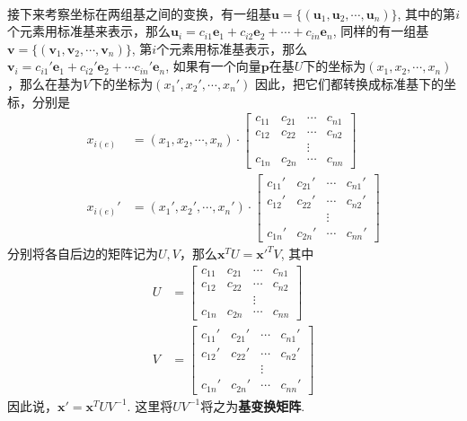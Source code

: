 \paragraph{}
接下来考察坐标在两组基之间的变换，有一组基$\textbf{u} = \{ (\textbf{u}_1, \textbf{u}_2, \cdots, \textbf{u}_n) \}$, 其中的第$i$个元素用标准基来表示，那么$\textbf{u}_i = c_{i1}\textbf{e}_1 + c_{i2}\textbf{e}_2 + \cdots + c_{in}\textbf{e}_n$, 同样的有一组基$\textbf{v} = \{ (\textbf{v}_1, \textbf{v}_2, \cdots, \textbf{v}_n) \}$, 第$i$个元素用标准基表示，那么$\textbf{v}_i = c_{i1}' \textbf{e}_1 + c_{i2}' \textbf{e}_2 + \cdots c_{in}' \textbf{e}_n$, 如果有一个向量$\textbf{p}$在基$U$下的坐标为$(x_1, x_2, \cdots, x_n)$，那么在基为$V$下的坐标为$(x_1', x_2', \cdots, x_n')$
因此，把它们都转换成标准基下的坐标，分别是
\begin{align*}
x_{i(e)} & = (x_1, x_2, \cdots, x_n) \cdot  \begin{bmatrix}
    c_{11} & c_{21} & \cdots & c_{n1} \\
    c_{12} & c_{22} & \cdots & c_{n2} \\
    & & \vdots & \\
    c_{1n} & c_{2n} & \cdots & c_{nn} 
  \end{bmatrix}   \\
x_{i(e)}' & =  (x_1', x_2', \cdots, x_n') \cdot  \begin{bmatrix}
    c_{11}' & c_{21}' & \cdots & c_{n1}' \\
    c_{12}' & c_{22}' & \cdots & c_{n2}' \\
    & & \vdots & \\
    c_{1n}' & c_{2n}' & \cdots & c_{nn}' 
  \end{bmatrix}
\end{align*}
分别将各自后边的矩阵记为$U, V$，那么$\textbf{x}^T U = \textbf{x}'^T V$, 其中
\begin{align*}
U & = \begin{bmatrix}
    c_{11} & c_{21} & \cdots & c_{n1} \\
    c_{12} & c_{22} & \cdots & c_{n2} \\
    & & \vdots & \\
    c_{1n} & c_{2n} & \cdots & c_{nn} 
  \end{bmatrix} \\
 V  & = \begin{bmatrix}
    c_{11}' & c_{21}' & \cdots & c_{n1}' \\
    c_{12}' & c_{22}' & \cdots & c_{n2}' \\
    & & \vdots & \\
    c_{1n}' & c_{2n}' & \cdots & c_{nn}' 
  \end{bmatrix}
\end{align*}
因此说，$\textbf{x}' = \textbf{x}^T U V^{-1}$.  这里将$U V^{-1}$将之为\textbf{基变换矩阵}. 

